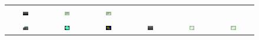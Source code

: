 \documentclass[10pt,journal,cspaper,compsoc]{IEEEtran}
\begin{document}
\begin{figure}[htbp]
\begin{center}
\begin{tabular}{cccccc}
\includegraphics[width=0.15\textwidth]{GCT_9.png} &
\includegraphics[width=0.15\textwidth]{GCT_10.png} &
\includegraphics[width=0.15\textwidth]{GCT_3.png} \\
\includegraphics[width=0.15\textwidth]{HunterPhoto.jpg} &
\includegraphics[width=0.15\textwidth]{point_cloud.png} &
\includegraphics[width=0.15\textwidth]{TH_7.png} &
\includegraphics[width=0.15\textwidth]{TH_9.png} &
\includegraphics[width=0.15\textwidth]{TH_10.png} &
\includegraphics[width=0.15\textwidth]{TH_3.png} \\

\end{tabular}
\end{center}
\end{figure}
\end{document}
